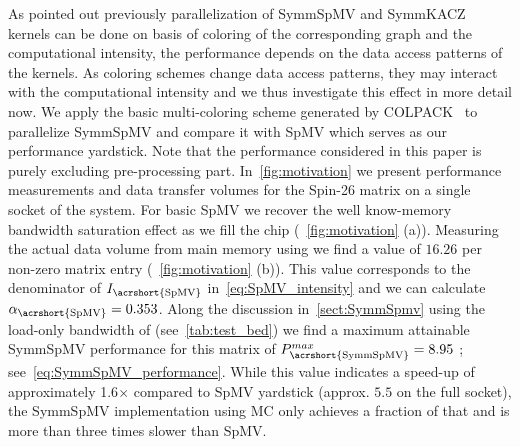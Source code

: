 
As pointed out previously parallelization of \acrshort{SymmSpMV} and \acrshort{SymmKACZ} kernels can be done on basis of \DTWO coloring of the corresponding graph and the computational intensity, \ie the performance depends on the data access patterns of the kernels. As coloring schemes change data access patterns, they may interact with the computational intensity and we thus investigate this effect in more detail now. We apply  the basic multi-coloring scheme generated by COLPACK~\cite{COLPACK} to parallelize \acrshort{SymmSpMV} and compare it with \acrshort{SpMV} which serves as our performance yardstick. Note that the performance considered in this paper is purely excluding pre-processing part. In~\cref{fig:motivation} we present performance measurements and data transfer volumes for the Spin-26 matrix on a single socket of the \IVB system. For basic \acrshort{SpMV} we recover the well know-memory bandwidth saturation effect as we fill the chip (~\cref{fig:motivation} (a)). Measuring the actual data volume from main memory using \LIKWID we find a value of $16.26$ \BYTE per non-zero matrix entry (~\cref{fig:motivation} (b)). This value corresponds to the denominator of $I_\mathrm{\acrshort{SpMV}}$ in~\cref{eq:SpMV_intensity} and we can calculate $\alpha_\mathrm{\acrshort{SpMV}}=0.353$. Along the discussion in~\cref{sect:SymmSpmv} using the load-only bandwidth of \IVB (see~\cref{tab:test_bed}) we find a maximum attainable {\acrshort{SymmSpMV}} performance for this matrix of $P^{max}_\mathrm{\acrshort{SymmSpMV}}=8.95$ \GF; see~\cref{eq:SymmSpMV_performance}. While this value indicates a speed-up of approximately 1.6$\times$ compared to \acrshort{SpMV} yardstick (approx. $5.5$ \GF on the full socket), the \acrshort{SymmSpMV} implementation using \acrfull{MC} only achieves a fraction of that and is more than three times slower than \acrshort{SpMV}. 



